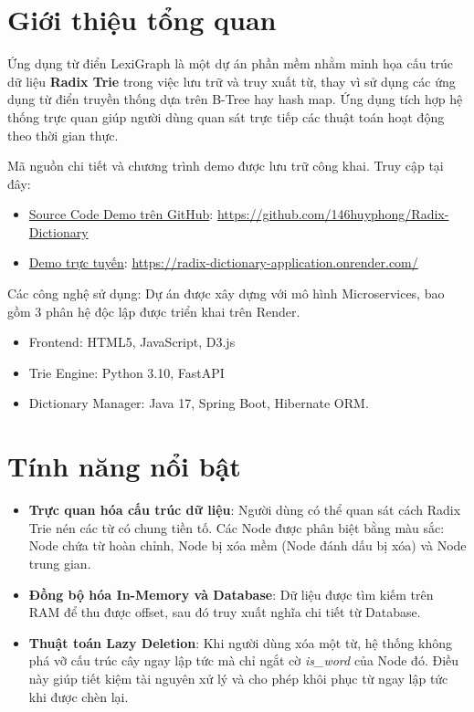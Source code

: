 \documentclass[12pt, a4paper]{article}
\begin{document}


\newpage
\tableofcontents
\newpage

\section{Giới thiệu tổng quan}
\indent Ứng dụng từ điển LexiGraph là một dự án phần mềm nhằm minh họa cấu trúc dữ liệu \textbf{Radix Trie} trong việc lưu trữ và truy xuất từ, thay vì sử dụng các ứng dụng từ điển truyền thống dựa trên B-Tree hay hash map. Ứng dụng tích hợp hệ thống trực quan giúp người dùng quan sát trực tiếp các thuật toán hoạt động theo thời gian thực.

Mã nguồn chi tiết và chương trình demo được lưu trữ công khai. 
Truy cập tại đây:
\begin{itemize}
    \item \href{https://github.com/146huyphong/Radix-Dictionary}{Source Code Demo trên GitHub}: \url{https://github.com/146huyphong/Radix-Dictionary}
    \item \href{https://radix-dictionary-application.onrender.com/}{Demo trực tuyến}: \url{https://radix-dictionary-application.onrender.com/}
\end{itemize}

Các công nghệ sử dụng:
Dự án được xây dựng với mô hình Microservices, bao gồm 3 phân hệ độc lập được triển khai trên Render.
\begin{itemize}
    \item Frontend: HTML5, JavaScript, D3.js
    \item Trie Engine: Python 3.10, FastAPI
    \item Dictionary Manager: Java 17, Spring Boot, Hibernate ORM.
\end{itemize}

\section{Tính năng nổi bật}
\begin{itemize}
    \item \textbf{Trực quan hóa cấu trúc dữ liệu}: Người dùng có thể quan sát cách Radix Trie nén các từ có chung tiền tố. Các Node được phân biệt bằng màu sắc: Node chứa từ hoàn chỉnh, Node bị xóa mềm (Node đánh dấu bị xóa) và Node trung gian.
    \item \textbf{Đồng bộ hóa In-Memory và Database}: Dữ liệu được tìm kiếm trên RAM để thu được offset, sau đó truy xuất nghĩa chi tiết từ Database.
    \item \textbf{Thuật toán Lazy Deletion}: Khi người dùng xóa một từ, hệ thống không phá vỡ cấu trúc cây ngay lập tức mà chỉ ngắt cờ \textit{is\_word} của Node đó. Điều này giúp tiết kiệm tài nguyên xử lý và cho phép khôi phục từ ngay lập tức khi được chèn lại.  
\end{itemize} 
\end{document}
